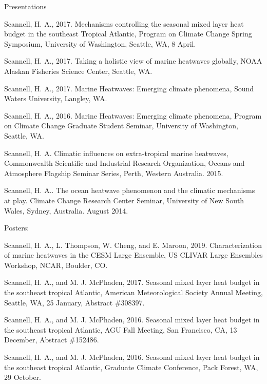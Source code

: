 \documentclass{resume} %
\begin{document}
\begin{rSection}{Presentations}
\begin{etaremune}
\item Scannell, H. A., 2017. Mechanisms controlling the seasonal mixed layer heat budget in the southeast Tropical Atlantic, Program on Climate Change Spring Symposium, University of Washington, Seattle, WA, 8 April.

\item Scannell, H. A., 2017. Taking a holistic view of marine heatwaves globally, NOAA Alaskan Fisheries Science Center, Seattle, WA.

\item Scannell, H. A., 2017. Marine Heatwaves: Emerging climate phenomena, Sound Waters University, Langley, WA.

\item Scannell, H. A., 2016. Marine Heatwaves: Emerging climate phenomena, Program on Climate Change Graduate Student Seminar, University of Washington, Seattle, WA.

\item Scannell, H. A. Climatic influences on extra-tropical marine heatwaves, Commonwealth Scientific and Industrial Research Organization, Oceans and Atmosphere Flagship Seminar Series, Perth, Western Australia. 2015.


\newpage

\item {Scannell, H. A.. The ocean heatwave phenomenon and the climatic mechanisms at play. Climate Change Research Center Seminar, University of New South Wales, Sydney, Australia. August 2014.}
\end{etaremune}


Posters:
\begin{etaremune}

\item Scannell, H. A., L. Thompson, W. Cheng, and E. Maroon, 2019. Characterization of marine heatwaves in the CESM Large Ensemble, US CLIVAR Large Ensembles Workshop, NCAR, Boulder, CO.

\item Scannell, H. A., and M. J. McPhaden, 2017. Seasonal mixed layer heat budget in the southeast tropical Atlantic, American Meteorological Society Annual Meeting, Seattle, WA, 25 January, Abstract \#308397.

\item Scannell, H. A., and M. J. McPhaden, 2016. Seasonal mixed layer heat budget in the southeast tropical Atlantic, AGU Fall Meeting, San Francisco, CA, 13 December, Abstract \#152486.

\item Scannell, H. A., and M. J. McPhaden, 2016. Seasonal mixed layer heat budget in the southeast tropical Atlantic, Graduate Climate Conference, Pack Forest, WA, 29 October.


\end{etaremune}
\end{rSection}
\end{document}
